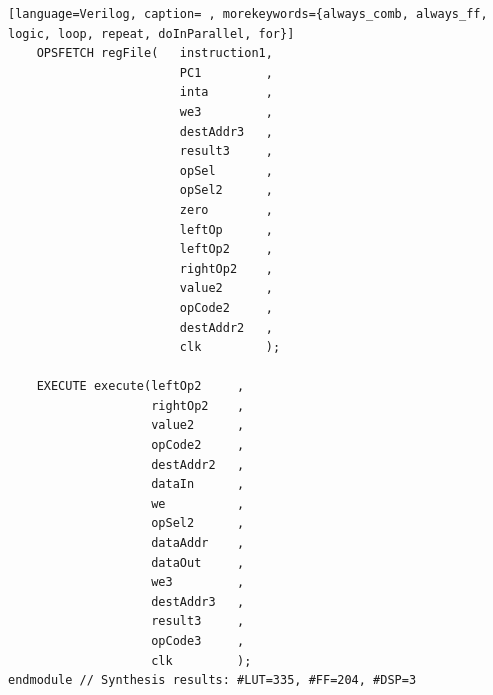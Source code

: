 {\begin{shaded*}
\begin{lstlisting}[language=Verilog, caption= , morekeywords={always_comb, always_ff, logic, loop, repeat, doInParallel, for}]
    OPSFETCH regFile(   instruction1,
                        PC1         ,
                        inta        ,
                        we3         ,
                        destAddr3   ,
                        result3     ,
                        opSel       ,
                        opSel2      ,
                        zero        ,
                        leftOp      ,
                        leftOp2     ,
                        rightOp2    ,
                        value2      ,
                        opCode2     ,
                        destAddr2   ,
                        clk         );

    EXECUTE execute(leftOp2     ,
                    rightOp2    ,
                    value2      ,
                    opCode2     ,
                    destAddr2   ,
                    dataIn      ,
                    we          ,
                    opSel2      ,
                    dataAddr    ,
                    dataOut     ,
                    we3         ,
                    destAddr3   ,
                    result3     ,
                    opCode3     ,
                    clk         );
endmodule // Synthesis results: #LUT=335, #FF=204, #DSP=3
\end{lstlisting}
\end{shaded*}
}


